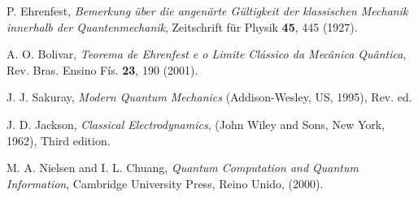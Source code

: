 \documentclass[twocolumn]{rbef}
\newcommand{\1}{\mathbbm{1}}
\begin{document}
\begin{thebibliography}{99}
 P. Ehrenfest, \textit{Bemerkung über die angenärte
    Gültigkeit der klassischen Mechanik innerhalb der Quantenmechanik},
  Zeitschrift für Physik \textbf{45}, 445 (1927).

 A. O. Bolivar, \textit{Teorema de Ehrenfest e o Limite
    Clássico da Mecânica Quântica}, Rev. Bras. Ensino Fís. \textbf{23},
  190 (2001).

 J. J. Sakuray, \textit{Modern Quantum Mechanics}
  (Addison-Wesley, US, 1995), Rev. ed.

 J. D. Jackson, \textit{Classical Electrodynamics},
  (John Wiley and Sons, New York, 1962), Third edition.

 M. A. Nielsen and I. L. Chuang, \textit{Quantum
    Computation and Quantum Information}, Cambridge University Press,
  Reino Unido, (2000).

\end{thebibliography}
\end{document}
